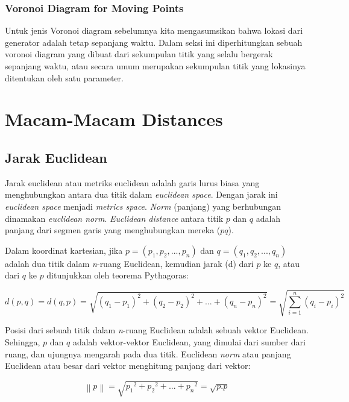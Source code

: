 \subsubsection{Voronoi Diagram for Moving Points}
Untuk jenis Voronoi diagram sebelumnya kita mengasumsikan bahwa lokasi dari generator adalah tetap sepanjang waktu. Dalam seksi ini diperhitungkan sebuah voronoi diagram yang dibuat dari sekumpulan titik yang selalu bergerak sepanjang waktu, atau secara umum merupakan sekumpulan titik yang lokasinya ditentukan oleh satu parameter.

\section{Macam-Macam Distances}

\subsection{Jarak Euclidean}
Jarak euclidean atau metriks euclidean adalah garis lurus biasa yang menghubungkan antara dua titik dalam \textit{euclidean space}. Dengan jarak ini \textit{euclidean space} menjadi \textit{metrics space}. \textit{Norm} (panjang) yang berhubungan dinamakan \textit{euclidean norm}. \textit{Euclidean distance} antara titik $p$ dan $q$ adalah panjang dari segmen garis yang menghubungkan mereka ($pq$).

Dalam koordinat kartesian, jika $p = (p_1, p_2, ..., p_n)$ dan $q = (q_1, q_2, ..., q_n)$ adalah dua titik dalam \textit{n}-ruang Euclidean, kemudian jarak (d) dari $p$ ke $q$, atau dari $q$ ke $p$ ditunjukkan oleh teorema Pythagoras:

\begin{equation} \label{euclidean}
	d(p, q) = d(q, p) = \sqrt{{\left (q_1 - p_1 \right )^2} + {\left (q_2 - p_2 \right )^2} + ... + {\left (q_n - p_n \right )^2}}
	= \sqrt{\sum_{i = 1}^{n} {(q_i - p_i)}^2}
\end{equation} 

Posisi dari sebuah titik dalam \textit{n}-ruang Euclidean adalah sebuah vektor Euclidean. Sehingga, $p$ dan $q$ adalah vektor-vektor Euclidean, yang dimulai dari sumber dari ruang, dan ujungnya mengarah pada dua titik. Euclidean \textit{norm} atau panjang Euclidean atau besar dari vektor menghitung panjang dari vektor:

\begin{equation}
	\left \| p \right \| = \sqrt{{p_1}^2 + {p_2}^2 + ... + {p_n}^2} = \sqrt{p.p}
\end{equation}

